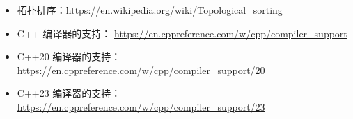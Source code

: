 \begin{itemize}
\item
拓扑排序：\url{https://en.wikipedia.org/wiki/Topological_sorting}

\item
C++ 编译器的支持： \url{https://en.cppreference.com/w/cpp/compiler_support}

\item
C++20 编译器的支持： \url{https://en.cppreference.com/w/cpp/compiler_support/20}

\item
C++23 编译器的支持： \url{https://en.cppreference.com/w/cpp/compiler_support/23}
\end{itemize}